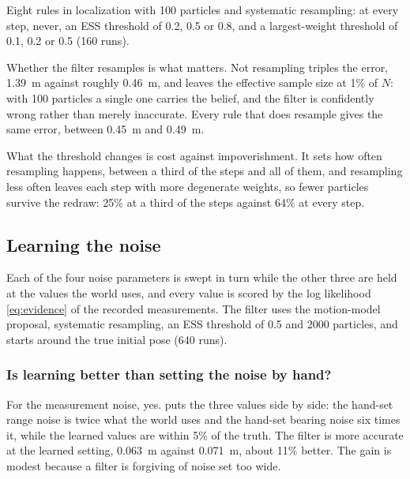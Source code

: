Eight rules in localization with 100 particles and systematic resampling: at every step, never, an ESS threshold
of 0.2, 0.5 or 0.8, and a largest-weight threshold of 0.1, 0.2 or 0.5 (160 runs).

Whether the filter resamples is what matters. Not resampling triples the error, \SI{1.39}{\meter} against
roughly \SI{0.46}{\meter}, and leaves the effective sample size at 1\% of $N$: with 100 particles a single one
carries the belief, and the filter is confidently wrong rather than merely inaccurate. Every rule that does
resample gives the same error, between \SI{0.45}{\meter} and \SI{0.49}{\meter}.

What the threshold changes is cost against impoverishment. It sets how often resampling happens, between a third
of the steps and all of them, and resampling less often leaves each step with more degenerate weights, so fewer
particles survive the redraw: 25\% at a third of the steps against 64\% at every step.


\subsection{Learning the noise}\label{sec:results-learning}

Each of the four noise parameters is swept in turn while the other three are held at the values the world uses,
and every value is scored by the log likelihood \eqref{eq:evidence} of the recorded measurements. The filter uses
the motion-model proposal, systematic resampling, an ESS threshold of 0.5 and 2000 particles, and starts around
the true initial pose (640 runs).

\subsubsection{Is learning better than setting the noise by hand?}

For the measurement noise, yes.  puts the three values side by side: the hand-set range noise
is twice what the world uses and the hand-set bearing noise six times it, while the learned values are within
5\% of the truth. The filter is more accurate at the learned setting, \SI{0.063}{\meter} against
\SI{0.071}{\meter}, about 11\% better. The gain is modest because a filter is forgiving of noise set too wide.

